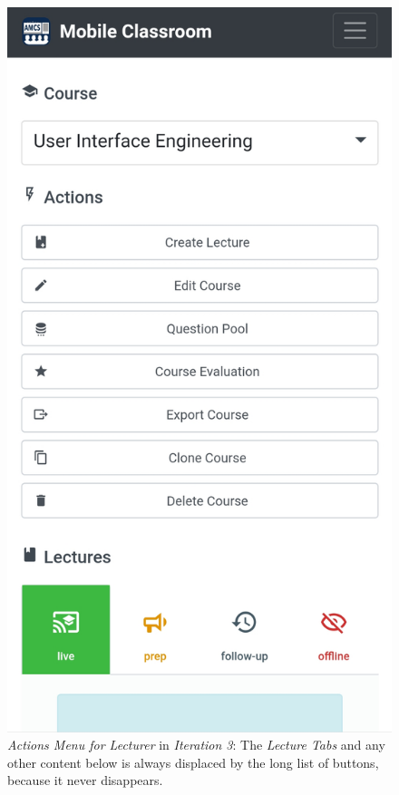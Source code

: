 \begin{figure}
	\vspace{1cm}
	\centering
	\begin{minipage}[t]{.5\textwidth}
		\centering
		\includegraphics[width=0.95\linewidth]{screenshots/redesign/problem_main_view_course_actions.jpg}
		\captionsetup{width=.8\linewidth}
		\captionsetup{format=plain}
		\caption{\emph{Actions Menu for Lecturer} in \emph{Iteration 3}: The \emph{Lecture Tabs} and any other content below is always displaced by the long list of buttons, because it never disappears. }

\end{minipage}
\end{figure}
